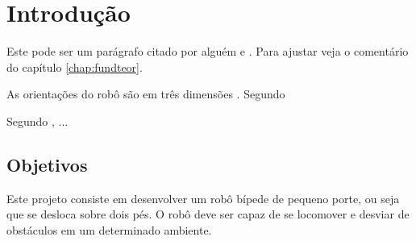 \chapter{Introdução}
\label{chap:intro}

Este pode ser um parágrafo citado por alguém \cite{Barabasi2003-1} e \cite{barabasi2003linked}.
Para ajustar veja o comentário do capítulo \ref{chap:fundteor}.

As orientações do robô são em três dimensões \cite{aperea-1}.
Segundo 

Segundo , ...

\section{Objetivos}
\label{sec:obj}


Este projeto consiste em desenvolver um robô bípede de pequeno porte, ou seja que se desloca sobre dois pés. O robô deve ser capaz de se locomover e desviar de obstáculos em um determinado ambiente. 
\label{sec:obj}





